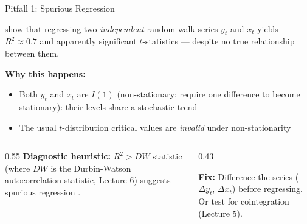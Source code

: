 \documentclass[aspectratio=169, 11pt]{beamer}
\begin{document}
\begin{frame}{Pitfall 1: Spurious Regression}
  \begin{warningbox}
    \textcite{GrangerNewbold1974} show that regressing two \emph{independent}
    random-walk series $y_t$ and $x_t$ yields $R^2 \approx 0.7$
    and apparently significant $t$-statistics ---
    despite no true relationship between them.
  \end{warningbox}
  \vspace{0.1cm}
  \textbf{Why this happens:}
  \begin{itemize}
    \item Both $y_t$ and $x_t$ are $I(1)$ (non-stationary; require one difference
          to become stationary): their levels share a stochastic trend
    \item The usual $t$-distribution critical values are \emph{invalid} under non-stationarity
  \end{itemize}
  \begin{columns}[T]
    \begin{column}{0.55\textwidth}
      \textbf{Diagnostic heuristic:} $R^2 > DW$ statistic (where $DW$
      is the Durbin-Watson autocorrelation statistic, Lecture 6) suggests
      spurious regression \parencite{GrangerNewbold1974}.
    \end{column}
    \begin{column}{0.43\textwidth}
      \begin{keybox}
        \small
        \textbf{Fix:} Difference the series
        ($\Delta y_t$, $\Delta x_t$) before
        regressing. Or test for
        cointegration (Lecture 5).
      \end{keybox}
    \end{column}
  \end{columns}
\end{frame}
\end{document}
